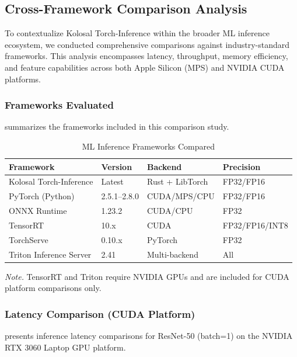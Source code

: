 \documentclass[10pt,twocolumn,a4paper]{article}
\theoremstyle{definition}
\theoremstyle{plain}
\begin{document}
\subsection{Cross-Framework Comparison Analysis}

To contextualize Kolosal Torch-Inference within the broader ML inference ecosystem, we conducted comprehensive comparisons against industry-standard frameworks. This analysis encompasses latency, throughput, memory efficiency, and feature capabilities across both Apple Silicon (MPS) and NVIDIA CUDA platforms.

\subsubsection{Frameworks Evaluated}

 summarizes the frameworks included in this comparison study.

\begin{table}[t]
\centering
\caption{ML Inference Frameworks Compared}
\label{tab:frameworks_compared}
\scriptsize
\setlength{\tabcolsep}{3pt}
\begin{tabular}{@{}llll@{}}
\toprule
\textbf{Framework} & \textbf{Version} & \textbf{Backend} & \textbf{Precision} \\
\midrule
Kolosal Torch-Inference & Latest & Rust + LibTorch & FP32/FP16 \\
PyTorch (Python) & 2.5.1--2.8.0 & CUDA/MPS/CPU & FP32/FP16 \\
ONNX Runtime & 1.23.2 & CUDA/CPU & FP32 \\
TensorRT & 10.x & CUDA & FP32/FP16/INT8 \\
TorchServe & 0.10.x & PyTorch & FP32 \\
Triton Inference Server & 2.41 & Multi-backend & All \\
\bottomrule
\end{tabular}

\vspace{0.5em}
\noindent\textit{Note.} TensorRT and Triton require NVIDIA GPUs and are included for CUDA platform comparisons only.
\end{table}

\subsubsection{Latency Comparison (CUDA Platform)}

 presents inference latency comparisons for ResNet-50 (batch=1) on the NVIDIA RTX 3060 Laptop GPU platform.
\end{document}
